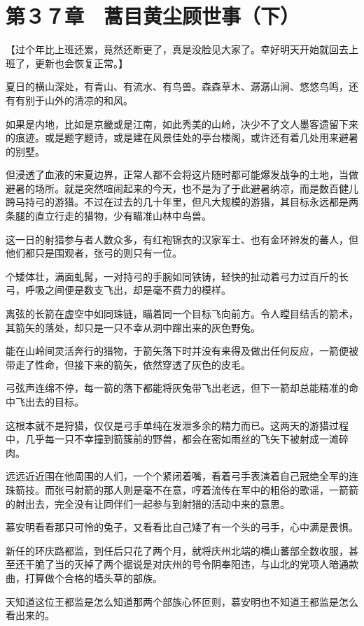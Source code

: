 \section{第３７章　蒿目黄尘顾世事（下）}

【过个年比上班还累，竟然还断更了，真是没脸见大家了。幸好明天开始就回去上班了，更新也会恢复正常。】

夏日的横山深处，有青山、有流水、有鸟兽。森森草木、潺潺山涧、悠悠鸟鸣，还有有别于山外的清凉的和风。

如果是内地，比如是京畿或是江南，如此秀美的山岭，决少不了文人墨客遗留下来的痕迹。或是题字题诗，或是建在风景佳处的亭台楼阁，或许还有着几处用来避暑的别墅。

但浸透了血液的宋夏边界，正常人都不会将这片随时都可能爆发战争的土地，当做避暑的场所。就是突然喧闹起来的今天，也不是为了于此避暑纳凉，而是数百健儿跨马持弓的游猎。不过在过去的几十年里，但凡大规模的游猎，其目标永远都是两条腿的直立行走的猎物，少有瞄准山林中鸟兽。

这一日的射猎参与者人数众多，有红袍锦衣的汉家军士、也有金环辫发的蕃人，但他们都只是围观者，张弓的则只有一位。

个矮体壮，满面虬髯，一对持弓的手腕如同铁铸，轻快的扯动着弓力过百斤的长弓，呼吸之间便是数支飞出，却是毫不费力的模样。

离弦的长箭在虚空中如同珠链，瞄着同一个目标飞向前方。令人瞠目结舌的箭术，其箭矢的落处，却只是一只不幸从洞中蹿出来的灰色野兔。

能在山岭间灵活奔行的猎物，于箭矢落下时并没有来得及做出任何反应，一箭便被带走了性命，但接下来的箭矢，依然穿透了灰色的皮毛。

弓弦声连绵不停，每一箭的落下都能将灰兔带飞出老远，但下一箭却总能精准的命中飞出去的目标。

这根本就不是狩猎，仅仅是弓手单纯在发泄多余的精力而已。这两天的游猎过程中，几乎每一只不幸撞到箭簇前的野兽，都会在密如雨丝的飞矢下被射成一滩碎肉。

远远近近围在他周围的人们，一个个紧闭着嘴，看着弓手表演着自己冠绝全军的连珠箭技。而张弓射箭的那人则是毫不在意，哼着流传在军中的粗俗的歌谣，一箭箭的射出去，完全没有让同伴们一起参与到射猎的活动中来的意思。

慕安明看看那只可怜的兔子，又看看比自己矮了有一个头的弓手，心中满是畏惧。

新任的环庆路都监，到任后只花了两个月，就将庆州北端的横山蕃部全数收服，甚至还干脆了当的灭掉了两个据说是对庆州的号令阴奉阳违，与山北的党项人暗通款曲，打算做个合格的墙头草的部族。

天知道这位王都监是怎么知道那两个部族心怀叵则，慕安明也不知道王都监是怎么看出来的。

